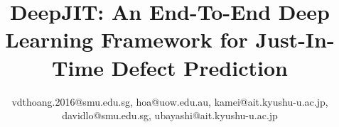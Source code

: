 \documentclass[conference]{IEEEtran}
\begin{document}
\title{DeepJIT: An End-To-End Deep Learning Framework for Just-In-Time Defect Prediction}

\author{
vdthoang.2016@smu.edu.sg, hoa@uow.edu.au, kamei@ait.kyushu-u.ac.jp, \\ davidlo@smu.edu.sg, ubayashi@ait.kyushu-u.ac.jp
}
%
\end{document}

